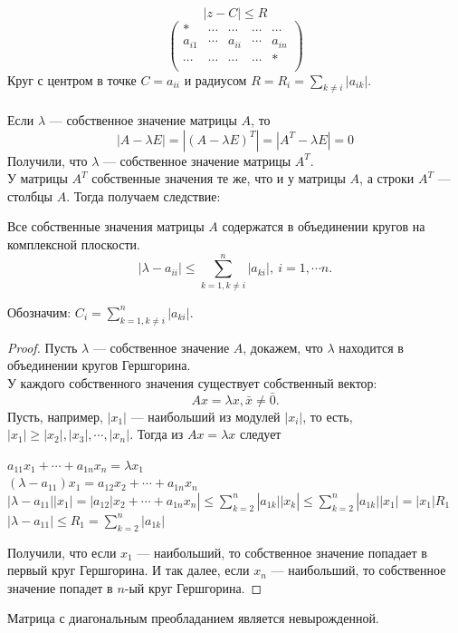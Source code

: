 $$|z-C|\leqslant R$$
\[\begin{pmatrix}
* & \cdots & \cdots & \cdots & \cdots\\
a_{i1} & \cdots & a_{ii} & \cdots & a_{in}\\
\cdots & \cdots & \cdots & \cdots & *\\
\end{pmatrix}\]
Круг с центром в точке $C=a_{ii}$ и радиусом $R=R_i=\sum\limits_{k\neq i}|a_{ik}|.$\\
\\
Если $\lambda$ --- собственное значение матрицы $A$, то
$$|A-\lambda E|=|(A-\lambda E)^T|=|A^T-\lambda E|=0$$
Получили, что $\lambda$ --- собственное значение матрицы $A^T$.\\ 
У матрицы $A^T$ собственные значения те же, что и у матрицы $A$, а строки $A^T$ --- столбцы $A$. Тогда получаем следствие:
\begin{consequence}
    Все собственные значения матрицы $A$ содержатся в объединении кругов на комплексной плоскости. $$|\lambda-a_{ii}|\leqslant \sum\limits_{k=1, k\neq i}^n|a_{ki}|,~i=1,\cdots n.$$
    
    Обозначим: $C_i=\sum\limits_{k=1, k\neq i}^n|a_{ki}|.$
\end{consequence} 
\begin{proof}
    Пусть $\lambda$ --- собственное значение $A$, докажем, что $\lambda$ находится в объединении кругов Гершгорина.\\
    У каждого собственного значения существует собственный вектор: $$Ax=\lambda x, \bar x\neq \bar 0.$$
    Пусть, например, $|x_1|$ --- наибольший из модулей $|x_i|$, то есть, $|x_1|\geqslant|x_2|,|x_3|,\cdots,|x_n|$. Тогда из $Ax=\lambda x$ следует
    \begin{center}
        $a_{11}x_1+\cdots+a_{1n}x_n=\lambda x_1$\\
        $(\lambda-a_{11})x_1=a_{12}x_2+\cdots+a_{1n}x_n$\\
        $|\lambda-a_{11}||x_1|=|a_{12}|x_2+\cdots+a_{1n}x_n|\leqslant\sum\limits_{k=2}^n|a_{1k}||x_k|\leqslant\sum\limits_{k=2}^n|a_{1k}||x_1|=|x_1|R_1$\\
        $|\lambda-a_{11}|\leqslant R_1=\sum\limits_{k=2}^n|a_{1k}|$
    \end{center}
    Получили, что если $x_1$ --- наибольший, то собственное значение попадает в первый круг Гершгорина. И так далее, если $x_n$ --- наибольший, то собственное значение попадет в $n$-ый круг Гершгорина.
\end{proof}
\begin{consequence}
    Матрица с диагональным преобладанием является невырожденной.
\end{consequence} 

